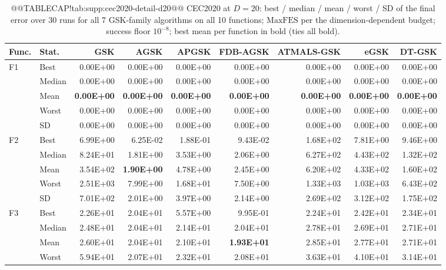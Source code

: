 \documentclass[10pt,a4paper]{article}
\newcommand{\bestval}[1]{\textbf{#1}}
\begin{document}
\begin{table}[p]
\caption{@@TABLECAP!tab:supp:cec2020-detail-d20@@ CEC2020 at $D = 20$: best / median / mean / worst / SD of
the final error over 30 runs for all 7 GSK-family algorithms
on all 10 functions;
$\mathrm{MaxFES}$ per the dimension-dependent budget; success floor
$10^{-8}$; best mean per function in bold (ties all bold).
}\label{tab:supp:cec2020-detail-d20}


\zebra
\begin{tabular}{llrrrrrrr}
\toprule
\textbf{Func.} & \textbf{Stat.} & \textbf{GSK} & \textbf{AGSK} & \textbf{APGSK} & \textbf{FDB-AGSK} & \textbf{ATMALS-GSK} & \textbf{eGSK} & \textbf{DT-GSK} \\
\midrule
F1 & Best & 0.00E+00 & 0.00E+00 & 0.00E+00 & 0.00E+00 & 0.00E+00 & 0.00E+00 & 0.00E+00 \\
 & Median & 0.00E+00 & 0.00E+00 & 0.00E+00 & 0.00E+00 & 0.00E+00 & 0.00E+00 & 0.00E+00 \\
 & Mean & \bestval{0.00E+00} & \bestval{0.00E+00} & \bestval{0.00E+00} & \bestval{0.00E+00} & \bestval{0.00E+00} & \bestval{0.00E+00} & \bestval{0.00E+00} \\
 & Worst & 0.00E+00 & 0.00E+00 & 0.00E+00 & 0.00E+00 & 0.00E+00 & 0.00E+00 & 0.00E+00 \\
 & SD & 0.00E+00 & 0.00E+00 & 0.00E+00 & 0.00E+00 & 0.00E+00 & 0.00E+00 & 0.00E+00 \\
\midrule
F2 & Best & 6.99E+00 & 6.25E-02 & 1.88E-01 & 9.43E-02 & 1.68E+02 & 7.81E+00 & 9.46E+00 \\
 & Median & 8.24E+01 & 1.81E+00 & 3.53E+00 & 2.06E+00 & 6.27E+02 & 4.43E+02 & 1.32E+02 \\
 & Mean & 3.54E+02 & \bestval{1.90E+00} & 4.78E+00 & 2.45E+00 & 6.20E+02 & 4.33E+02 & 1.60E+02 \\
 & Worst & 2.51E+03 & 7.99E+00 & 1.68E+01 & 7.50E+00 & 1.33E+03 & 1.03E+03 & 6.43E+02 \\
 & SD & 7.01E+02 & 2.01E+00 & 3.97E+00 & 2.14E+00 & 2.69E+02 & 3.12E+02 & 1.75E+02 \\
\midrule
F3 & Best & 2.26E+01 & 2.04E+01 & 5.57E+00 & 9.95E-01 & 2.24E+01 & 2.42E+01 & 2.34E+01 \\
 & Median & 2.48E+01 & 2.04E+01 & 2.14E+01 & 2.04E+01 & 2.78E+01 & 2.69E+01 & 2.71E+01 \\
 & Mean & 2.60E+01 & 2.04E+01 & 2.10E+01 & \bestval{1.93E+01} & 2.85E+01 & 2.77E+01 & 2.71E+01 \\
 & Worst & 5.94E+01 & 2.07E+01 & 2.32E+01 & 2.08E+01 & 3.63E+01 & 4.10E+01 & 3.14E+01 \\

\end{tabular}
\end{table}
\end{document}
